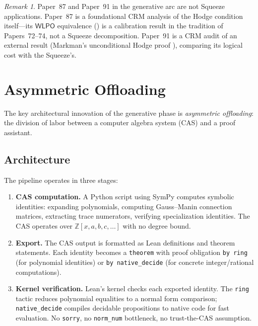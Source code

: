 \documentclass[11pt]{article}
\theoremstyle{plain}
\theoremstyle{definition}
\theoremstyle{remark}
\newtheorem{remark}[theorem]{Remark}
\newcommand{\ZZ}{\mathbb{Z}}
\newcommand{\WLPO}{\mathsf{WLPO}}
\begin{document}
\begin{remark}
Paper~87 and Paper~91 in the generative arc are not Squeeze
applications.  Paper~87 is a foundational CRM analysis of the Hodge
condition itself---its $\WLPO$ equivalence () is a
calibration result in the tradition of Papers~72--74, not a Squeeze
decomposition.  Paper~91 is a CRM audit of an external result
(Markman's unconditional Hodge proof \cite{markman}), comparing
its logical cost with the Squeeze's.
\end{remark}


\section{Asymmetric Offloading}\label{sec:offloading}

The key architectural innovation of the generative phase is
\emph{asymmetric offloading}: the division of labor between a
computer algebra system (CAS) and a proof assistant.

\subsection{Architecture}

The pipeline operates in three stages:
\begin{enumerate}[label=(\arabic*)]
\item \textbf{CAS computation.}  A Python script using SymPy
  computes symbolic identities: expanding polynomials, computing
  Gauss--Manin connection matrices, extracting trace numerators,
  verifying specialization identities.  The CAS operates over
  $\ZZ[x, a, b, c, \ldots]$ with no degree bound.

\item \textbf{Export.}  The CAS output is formatted as Lean
  definitions and theorem statements.  Each identity becomes a
  \texttt{theorem} with proof obligation \texttt{by ring} (for
  polynomial identities) or \texttt{by native\_decide} (for concrete
  integer/rational computations).

\item \textbf{Kernel verification.}  Lean's kernel checks each
  exported identity.  The \texttt{ring} tactic reduces polynomial
  equalities to a normal form comparison; \texttt{native\_decide}
  compiles decidable propositions to native code for fast evaluation.
  No \texttt{sorry}, no \texttt{norm\_num} bottleneck, no
  trust-the-CAS assumption.
\end{enumerate}
\end{document}
